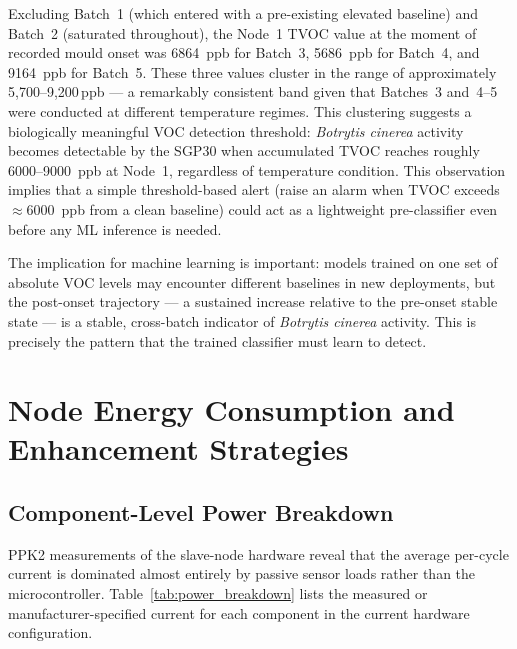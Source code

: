 Excluding Batch~1 (which entered with a pre-existing elevated baseline) and Batch~2 (saturated throughout), the Node~1 TVOC value at the moment of recorded mould onset was \SI{6864}{ppb} for Batch~3, \SI{5686}{ppb} for Batch~4, and \SI{9164}{ppb} for Batch~5. These three values cluster in the range of approximately 5,700--9,200\,ppb --- a remarkably consistent band given that Batches~3 and~4--5 were conducted at different temperature regimes. This clustering suggests a biologically meaningful VOC detection threshold: \textit{Botrytis cinerea} activity becomes detectable by the SGP30 when accumulated TVOC reaches roughly \SI{6000}{}--\SI{9000}{ppb} at Node~1, regardless of temperature condition. This observation implies that a simple threshold-based alert (raise an alarm when TVOC exceeds $\approx$\SI{6000}{ppb} from a clean baseline) could act as a lightweight pre-classifier even before any ML inference is needed.

The implication for machine learning is important: models trained on one set of absolute VOC levels may encounter different baselines in new deployments, but the post-onset trajectory --- a sustained increase relative to the pre-onset stable state --- is a stable, cross-batch indicator of \textit{Botrytis cinerea} activity. This is precisely the pattern that the trained classifier must learn to detect.

\section{Node Energy Consumption and Enhancement Strategies}\label{sec:res_energy}

\subsection{Component-Level Power Breakdown}\label{subsec:res_power_breakdown}

PPK2 measurements of the slave-node hardware reveal that the average per-cycle current is dominated almost entirely by passive sensor loads rather than the microcontroller. Table~\ref{tab:power_breakdown} lists the measured or manufacturer-specified current for each component in the current hardware configuration.

